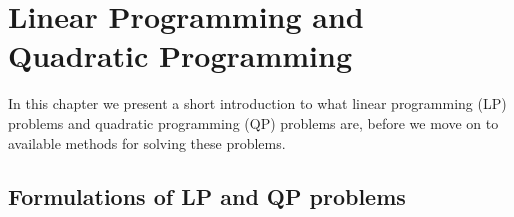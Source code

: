 \chapter{Linear Programming and Quadratic Programming}
\label{ch:background}

In this chapter we present a short introduction to what linear programming (LP)
problems and quadratic programming (QP) problems are, before we move on to
available methods for solving these problems.

\section{Formulations of LP and QP problems}
\label{sec:backlp}


%
